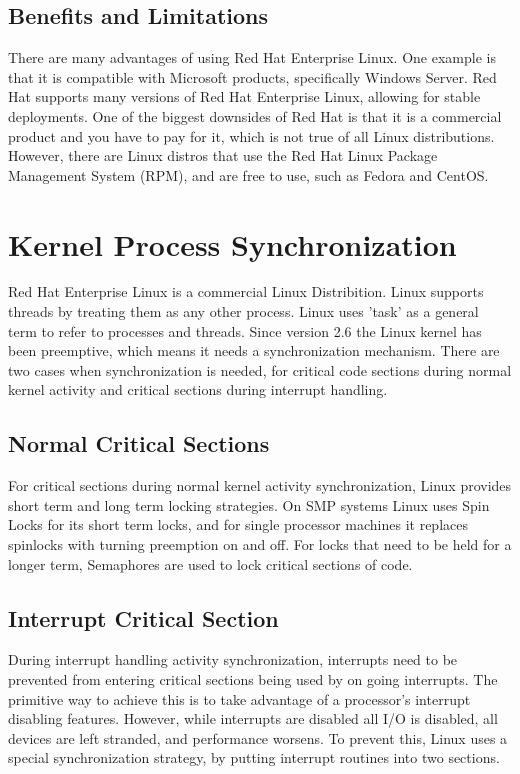 \documentclass[12pt]{article}
\begin{document}
\subsection{Benefits and Limitations}
There are many advantages of using Red Hat Enterprise Linux. One example is that it is compatible with Microsoft products, specifically Windows Server. Red Hat supports many versions of Red Hat Enterprise Linux, allowing for stable deployments. One of the biggest downsides of Red Hat is that it is a commercial product and you have to pay for it, which is not true of all Linux distributions. However, there are Linux distros that use the Red Hat Linux Package Management System (RPM), and are free to use, such as Fedora and CentOS. 



\section{Kernel Process Synchronization}

Red Hat Enterprise Linux is a commercial Linux Distribition. Linux supports threads by treating them as any other process. Linux uses 'task' as a general term to refer to processes and threads. Since version 2.6 the Linux kernel has been preemptive, which means it needs a synchronization mechanism. There are two cases when synchronization is needed, for critical code sections during normal kernel activity and critical sections during interrupt handling.

\subsection{Normal Critical Sections}
For critical sections during normal kernel activity synchronization, Linux provides short term and long term locking strategies. On SMP systems Linux uses Spin Locks for its short term locks, and for single processor machines it replaces spinlocks with turning preemption on and off. For locks that need to be held for a longer term, Semaphores are used to lock critical sections of code. 

\subsection{Interrupt Critical Section}
During interrupt handling activity synchronization, interrupts need to be prevented from entering critical sections being used by on going interrupts. The primitive way to achieve this is to take advantage of a processor's interrupt disabling features. However, while interrupts are disabled all I/O is disabled, all devices are left stranded, and performance worsens. To prevent this, Linux uses a special synchronization strategy, by putting interrupt routines into two sections.
\end{document}
